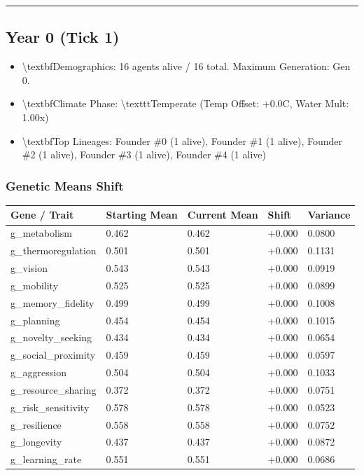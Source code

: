 \documentclass[11pt,a4paper]{article}
\begin{document}
\noindent\rule{\textwidth}{0.4pt}

\subsection*{ Year 0 (Tick 1)}
\begin{itemize}
  \item \textbackslash{}textbf{Demographics:} 16 agents alive / 16 total. Maximum Generation: Gen 0.
  \item \textbackslash{}textbf{Climate Phase:} \textbackslash{}texttt{Temperate} (Temp Offset: +0.0C, Water Mult: 1.00x)
  \item \textbackslash{}textbf{Top Lineages:} Founder \#0 (1 alive), Founder \#1 (1 alive), Founder \#2 (1 alive), Founder \#3 (1 alive), Founder \#4 (1 alive)
\end{itemize}

\subsubsection*{ Genetic Means Shift}
\begin{longtable}{lllll}
\toprule
Gene / Trait & Starting Mean & Current Mean & Shift & Variance \\
\midrule
\endhead
g\_metabolism & 0.462 & 0.462 & +0.000 & 0.0800 \\
g\_thermoregulation & 0.501 & 0.501 & +0.000 & 0.1131 \\
g\_vision & 0.543 & 0.543 & +0.000 & 0.0919 \\
g\_mobility & 0.525 & 0.525 & +0.000 & 0.0899 \\
g\_memory\_fidelity & 0.499 & 0.499 & +0.000 & 0.1008 \\
g\_planning & 0.454 & 0.454 & +0.000 & 0.1015 \\
g\_novelty\_seeking & 0.434 & 0.434 & +0.000 & 0.0654 \\
g\_social\_proximity & 0.459 & 0.459 & +0.000 & 0.0597 \\
g\_aggression & 0.504 & 0.504 & +0.000 & 0.1033 \\
g\_resource\_sharing & 0.372 & 0.372 & +0.000 & 0.0751 \\
g\_risk\_sensitivity & 0.578 & 0.578 & +0.000 & 0.0523 \\
g\_resilience & 0.558 & 0.558 & +0.000 & 0.0752 \\
g\_longevity & 0.437 & 0.437 & +0.000 & 0.0872 \\
g\_learning\_rate & 0.551 & 0.551 & +0.000 & 0.0686 \\
\bottomrule
\end{longtable}
\end{document}
